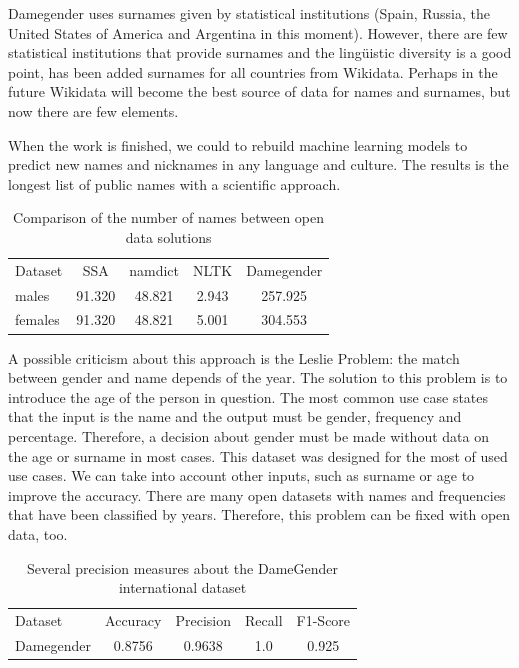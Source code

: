 \documentclass[a4paper]{article}
\begin{document}
Damegender uses surnames given by statistical institutions (Spain,
Russia, the United States of America and Argentina in this moment).
However, there are few statistical institutions that provide
surnames and the lingüistic diversity is a good point, has been
added surnames for all countries from Wikidata. Perhaps in the future
Wikidata will become the best source of data for names and surnames,
but now there are few elements.

When the work is finished, we could to rebuild machine learning models
to predict new names and nicknames in any language and culture. The
results is the longest list of public names with a scientific approach.

\begin{table}[t]
\footnotesize
\begin{tabular}[]{lcccc}
  \hline
  Dataset & SSA & namdict & NLTK & Damegender \tabularnewline
  males & 91.320 & 48.821 & 2.943 & 257.925 \tabularnewline
  females & 91.320 & 48.821 & 5.001 & 304.553 \tabularnewline
  \hline
\end{tabular}
\caption{Comparison of the number of names between open data solutions}
\label{table:DifferentNamesMeasures}
\end{table}

A possible criticism about this approach is the Leslie
Problem\cite{blevins2015jane}: the match between gender and name
depends of the year. The solution to this problem is to introduce the
age of the person in question. The most common use case states that
the input is the name and the output must be gender, frequency and
percentage. Therefore, a decision about gender must be made without
data on the age or surname in most cases. This dataset was designed for
the most of used use cases. We can take into account other inputs,
such as surname or age to improve the accuracy. There are many open
datasets with names and frequencies that have been classified by years.
Therefore, this problem can be fixed with open data, too.

\begin{table}[t]
\footnotesize
\begin{tabular}[]{lcccc}
  \hline
  Dataset  & Accuracy & Precision & Recall & F1-Score  \tabularnewline
  Damegender &  0.8756  & 0.9638    & 1.0    & 0.925  \tabularnewline
  \hline
\end{tabular}
\caption{Several precision measures about the DameGender international dataset}
\label{table:DifferentAccuracyMeasures}
\end{table}
\end{document}
